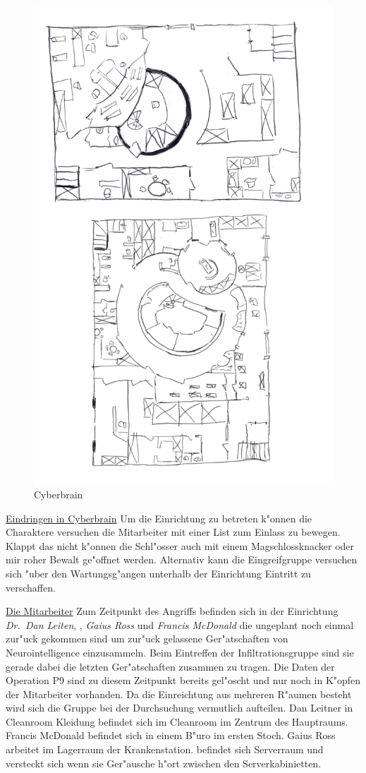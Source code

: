 \begin{figure}
    \includegraphics[width=0.9\linewidth]{./images/cyberbrain.png}
    \caption{Cyberbrain}
\end{figure}

\underline{Eindringen in Cyberbrain} Um die Einrichtung zu betreten k"onnen die Charaktere versuchen die Mitarbeiter mit einer List zum Einlass zu bewegen. Klappt das nicht k"onnen die Schl"osser auch mit einem Magschlossknacker oder mir roher Bewalt ge"offnet werden. Alternativ kann die Eingreifgruppe versuchen sich "uber den Wartungsg"angen unterhalb der Einrichtung Eintritt zu verschaffen.

\underline{Die Mitarbeiter} Zum Zeitpunkt des Angriffs befinden sich in der Einrichtung \emph{Dr.~Dan Leiten}, \emph{\ml{}}, \emph{Gaius Ross} und \emph{Francis McDonald} die ungeplant noch einmal zur"uck gekommen sind um zur"uck gelassene Ger"atschaften von Neurointelligence einzusammeln. Beim Eintreffen der Infiltrationsgruppe sind sie gerade dabei die letzten Ger"atschaften zusammen zu tragen. Die Daten der Operation P9 sind zu diesem Zeitpunkt bereits gel"oscht und nur noch in K"opfen der Mitarbeiter vorhanden. Da die Einreichtung aus mehreren R"aumen besteht wird sich die Gruppe bei der Durchsuchung vermutlich aufteilen. Dan Leitner in Cleanroom Kleidung befindet sich im Cleanroom im Zentrum des Hauptraums. Francis McDonald befindet sich in einem B"uro im ersten Stoch. Gaius Ross arbeitet im Lagerraum der Krankenstation. \ml{} befindet sich Serverraum und versteckt sich wenn sie Ger"ausche h"ort zwischen den Serverkabinietten.

